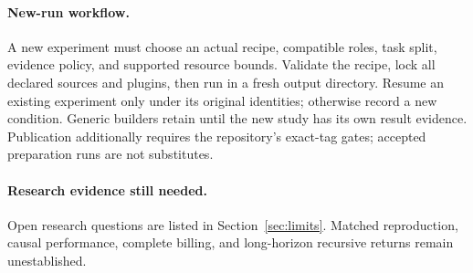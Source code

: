 \paragraph{New-run workflow.}
A new experiment must choose an actual recipe, compatible roles, task split, evidence policy, and supported resource bounds. Validate the recipe, lock all declared sources and plugins, then run in a fresh output directory. Resume an existing experiment only under its original identities; otherwise record a new condition. Generic builders retain  until the new study has its own result evidence. Publication additionally requires the repository's exact-tag gates; accepted preparation runs are not substitutes.

\paragraph{Research evidence still needed.}
Open research questions are listed in Section~\ref{sec:limits}. Matched reproduction, causal performance, complete billing, and long-horizon recursive returns remain unestablished.

